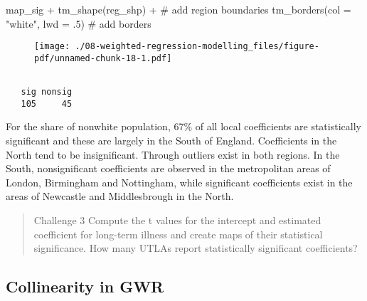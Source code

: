 \documentclass[
  letterpaper,
  krantz2]{style/krantz}
\newenvironment{Shaded}{\begin{snugshade}}{\end{snugshade}}
\newcommand{\AttributeTok}[1]{\textcolor[rgb]{0.40,0.45,0.13}{#1}}
\newcommand{\CommentTok}[1]{\textcolor[rgb]{0.37,0.37,0.37}{#1}}
\newcommand{\DecValTok}[1]{\textcolor[rgb]{0.68,0.00,0.00}{#1}}
\newcommand{\FunctionTok}[1]{\textcolor[rgb]{0.28,0.35,0.67}{#1}}
\newcommand{\NormalTok}[1]{\textcolor[rgb]{0.00,0.23,0.31}{#1}}
\newcommand{\SpecialCharTok}[1]{\textcolor[rgb]{0.37,0.37,0.37}{#1}}
\newcommand{\StringTok}[1]{\textcolor[rgb]{0.13,0.47,0.30}{#1}}
\begin{document}
\begin{Shaded}
\begin{Highlighting}[]
\NormalTok{map\_sig }\SpecialCharTok{+} \FunctionTok{tm\_shape}\NormalTok{(reg\_shp) }\SpecialCharTok{+} \CommentTok{\# add region boundaries}
  \FunctionTok{tm\_borders}\NormalTok{(}\AttributeTok{col =} \StringTok{"white"}\NormalTok{, }\AttributeTok{lwd =}\NormalTok{ .}\DecValTok{5}\NormalTok{) }\CommentTok{\# add borders}
\end{Highlighting}
\end{Shaded}

\begin{figure}[H]

{\centering \texttt{[image: ./08-weighted-regression-modelling\_files/figure-pdf/unnamed-chunk-18-1.pdf]}

}

\end{figure}

\begin{Shaded}
\end{Shaded}

\begin{verbatim}

   sig nonsig 
   105     45 
\end{verbatim}

For the share of nonwhite population, 67\% of all local coefficients are
statistically significant and these are largely in the South of England.
Coefficients in the North tend to be insignificant. Through outliers
exist in both regions. In the South, nonsignificant coefficients are
observed in the metropolitan areas of London, Birmingham and Nottingham,
while significant coefficients exist in the areas of Newcastle and
Middlesbrough in the North.

\begin{quote}
Challenge 3 Compute the t values for the intercept and estimated
coefficient for long-term illness and create maps of their statistical
significance. How many UTLAs report statistically significant
coefficients?
\end{quote}

\hypertarget{collinearity-in-gwr}{%
\subsection{Collinearity in GWR}\label{collinearity-in-gwr}}
\end{document}
